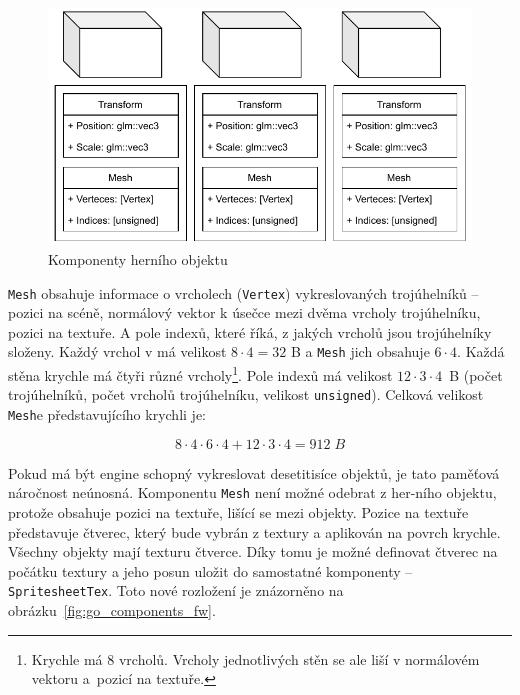 \documentclass[thesis=M,czech]{FITthesis}[2019/12/23]
\begin{document}
\begin{figure}\centering
	\includegraphics[width=\textwidth]{images/go_components}
	\caption[Komponenty herního objektu]{Komponenty herního objektu}\label{fig:go_components}
\end{figure}

\texttt{Mesh} obsahuje informace o vrcholech (\texttt{Vertex}) vykreslovaných trojúhelníků -- pozici na scéně, normálový vektor k úsečce mezi dvěma vrcholy trojúhelníku, pozici na textuře. A pole indexů, které říká, z jakých vrcholů jsou trojúhelníky složeny. Každý vrchol v má velikost $8 \cdot 4 = 32$ B a \texttt{Mesh} jich obsahuje $6 \cdot 4$. Každá stěna krychle má čtyři různé vrcholy\footnote{Krychle má 8 vrcholů. Vrcholy jednotlivých stěn se ale liší v normálovém vektoru a~pozicí na textuře.}. Pole indexů má velikost $12 \cdot 3 \cdot 4$~B (počet trojúhelníků, počet vrcholů trojúhelníku, velikost \texttt{unsigned}). Celková velikost \texttt{Mesh}e představujícího krychli je:

\[8 \cdot 4 \cdot 6 \cdot 4 + 12 \cdot 3 \cdot 4 = 912\; B\]

Pokud má být engine schopný vykreslovat desetitisíce objektů, je tato paměťová náročnost neúnosná. Komponentu \texttt{Mesh} není možné odebrat z her-ního objektu, protože obsahuje pozici na textuře, lišící se mezi objekty. Pozice na textuře představuje čtverec, který bude vybrán z textury a aplikován na povrch krychle. Všechny objekty mají texturu čtverce. Díky tomu je možné definovat čtverec na počátku textury a jeho posun uložit do samostatné komponenty -- \texttt{SpritesheetTex}. Toto nové rozložení je znázorněno na obrázku~\ref{fig:go_components_fw}.
\end{document}
